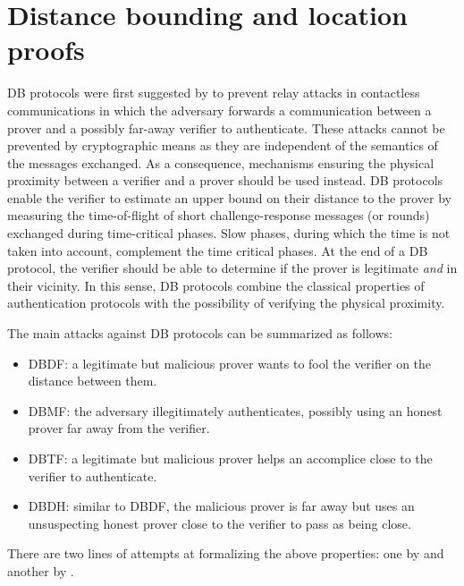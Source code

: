 \section{Distance bounding and location proofs}
\Ac{DB} protocols were first suggested by \citet{DistanceBounding} to prevent relay attacks in contactless communications in which the adversary forwards a communication between a prover and a possibly far-away verifier to authenticate. 
These attacks cannot be prevented by cryptographic means as they are independent of the semantics of the messages exchanged.
As a consequence, mechanisms ensuring the physical proximity between a verifier and a prover should be used instead.
\Ac{DB} protocols enable the verifier to estimate an upper bound on their distance to the prover by measuring the time-of-flight of short challenge-response messages (or rounds) exchanged during time-critical phases. 
Slow phases, during which the time is not taken into account, complement the time critical phases.
At the end of a \Ac{DB} protocol, the verifier should be able to determine if the prover is legitimate \emph{and} in their vicinity.
In this sense, \Ac{DB} protocols combine the classical properties of authentication protocols with the possibility of verifying the physical proximity.

The main attacks against \ac{DB} protocols can be summarized as follows:
\begin{itemize}
  \item \Acf{DBDF}: a legitimate but malicious prover wants to fool the verifier on the distance between them.
  \item \Acf{DBMF}: the adversary illegitimately authenticates, possibly using an honest prover far away from the verifier.
  \item \Acf{DBTF}: a legitimate but malicious prover helps an accomplice close to the verifier to authenticate.
  \item \Acf{DBDH}: similar to \ac{DBDF}, the malicious prover is far away but uses an unsuspecting honest prover close to the verifier to pass as being close.
\end{itemize}
There are two lines of attempts at formalizing the above properties: one by \citet{DB-BMV} and another by \citet{DB-DFKO}.

